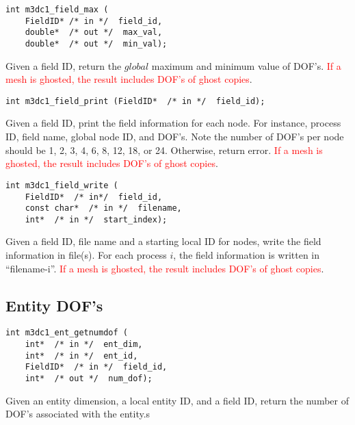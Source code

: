 \begin{verbatim}
int m3dc1_field_max (
    FieldID* /* in */  field_id, 
    double*  /* out */  max_val, 
    double*  /* out */  min_val);
\end{verbatim}\vspace{-.5cm}\hspace{1cm}
Given a field ID, return the $global$ maximum and minimum value of DOF's. \textcolor{red}{If a mesh is ghosted, the result includes DOF's of ghost copies}.

\begin{verbatim}
int m3dc1_field_print (FieldID*  /* in */  field_id);
\end{verbatim}\vspace{-.5cm}\hspace{1cm}
Given a field ID, print the field information for each node. For instance, process ID, field name, global node ID, and DOF's. Note the number of DOF's per node should be 1, 2, 3, 4, 6, 8, 12, 18, or 24. Otherwise, return error. \textcolor{red}{If a mesh is ghosted, the result includes DOF's of ghost copies}.

\begin{verbatim}
int m3dc1_field_write ( 
    FieldID*  /* in*/  field_id, 
    const char*  /* in */  filename, 
    int*  /* in */  start_index);
\end{verbatim}\vspace{-.5cm}\hspace{1cm}
Given a field ID, file name and a starting local ID for nodes, write the field information in file(s). For each process $i$, the field information is written in ``filename-i''. \textcolor{red}{If a mesh is ghosted, the result includes DOF's of ghost copies}.

\subsection{Entity DOF's}

\begin{verbatim}
int m3dc1_ent_getnumdof (
    int*  /* in */  ent_dim, 
    int*  /* in */  ent_id, 
    FieldID*  /* in */  field_id, 
    int*  /* out */  num_dof);
\end{verbatim}\vspace{-.5cm}\hspace{1cm}
Given an entity dimension, a local entity ID, and a field ID, return the number of DOF's associated with the entity.s

